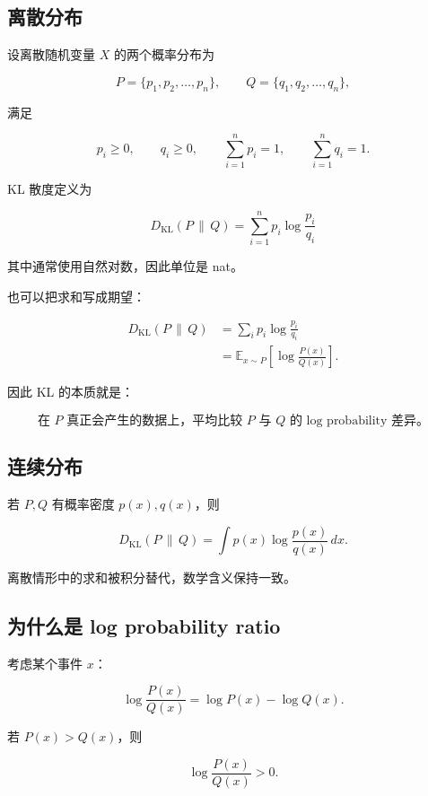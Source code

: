 \documentclass[11pt,a4paper]{ctexart}
\newcommand{\KL}[2]{D_{\mathrm{KL}}\!\left(#1\,\middle\|\,#2\right)}
\newcommand{\E}{\mathbb{E}}
\begin{document}
\subsection{离散分布}

设离散随机变量 $X$ 的两个概率分布为

\[
P=\{p_1,p_2,\ldots,p_n\},
\qquad
Q=\{q_1,q_2,\ldots,q_n\},
\]

满足

\[
p_i\ge 0,\qquad q_i\ge 0,
\qquad
\sum_{i=1}^{n}p_i=1,
\qquad
\sum_{i=1}^{n}q_i=1.
\]

KL 散度定义为

\begin{equation}
\boxed{
\KL{P}{Q}
=
\sum_{i=1}^{n}
p_i\log\frac{p_i}{q_i}
}
\label{eq:kl_discrete}
\end{equation}

其中通常使用自然对数，因此单位是 nat。

也可以把求和写成期望：

\begin{align}
\KL{P}{Q}
&=
\sum_i p_i\log\frac{p_i}{q_i}
\\
&=
\E_{x\sim P}
\left[
\log\frac{P(x)}{Q(x)}
\right].
\label{eq:kl_expectation}
\end{align}

因此 KL 的本质就是：

\[
\boxed{
\text{在 }P\text{ 真正会产生的数据上，平均比较 }P\text{ 与 }Q\text{ 的 log probability 差异。}
}
\]

\subsection{连续分布}

若 $P,Q$ 有概率密度 $p(x),q(x)$，则

\begin{equation}
\KL{P}{Q}
=
\int
p(x)\log\frac{p(x)}{q(x)}\,dx.
\end{equation}

离散情形中的求和被积分替代，数学含义保持一致。

\subsection{为什么是 log probability ratio}

考虑某个事件 $x$：

\[
\log\frac{P(x)}{Q(x)}
=
\log P(x)-\log Q(x).
\]

若 $P(x)>Q(x)$，则

\[
\log\frac{P(x)}{Q(x)}>0.
\]
\end{document}
